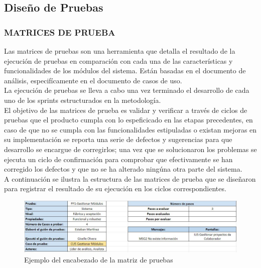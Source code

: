 \subsection{Diseño de Pruebas}

\subsubsection{MATRICES DE PRUEBA}

Las matrices de pruebas son una herramienta que detalla el resultado de la ejecución de pruebas en comparación con cada una de las características y funcionalidades de los módulos del sistema. Están basadas en el documento de análisis, especifícamente en el documento de casos de uso.\\

La ejecución de pruebas se lleva a cabo una vez terminado el desarrollo de cada uno de los sprints estructurados en la metodología.\\

El objetivo de las matrices de prueba es validar y verificar a través de ciclos de pruebas que el producto cumpla con lo espeficicado en las etapas precedentes, en caso de que no se cumpla con las funcionalidades estipuladas o existan mejoras en su implementación se reporta una serie de defectos y sugerencias para que desarrollo se encargue de corregirlos; una vez que se solucionaron los problemas se ejecuta un ciclo de confirmación para comprobar que efectivamente se han corregido los defectos y que no se ha alterado ningúna otra parte del sistema.\\

A continuación se ilustra la estructura de las matrices de prueba que se diseñaron para registrar el resultado de su ejecución en los ciclos correspondientes.\\

\begin{figure}[H]
	\begin{center}
		\includegraphics[width=.95\textwidth]{images/pruebas/diseno/encabezado}
		\caption{Ejemplo del encabezado de la matriz de pruebas}
		\label{fig:encabezado}
	\end{center}
\end{figure}

